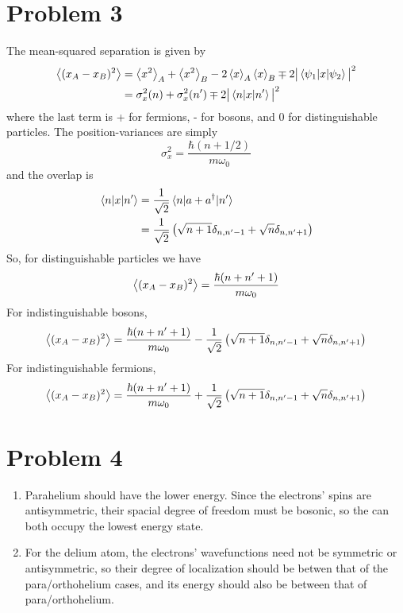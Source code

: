 \documentclass[12pt]{article}
\newcommand{\magsq}[1]{\big|#1\big|^2}
\begin{document}
\section*{Problem 3}
The mean-squared separation is given by
\begin{align*}
    \ev{(x_A - x_B)^2} &= \ev{x^2}_A + \ev{x^2}_B - 2\ev{x}_A\ev{x}_B \mp 2\magsq{\mel{\psi_1}{x}{\psi_2}} \\
    &= \sigma_x^2(n) + \sigma_x^2(n') \mp 2\magsq{\mel{n}{x}{n'}}
\end{align*}
where the last term is + for fermions, - for bosons, and 0 for distinguishable particles. The position-variances are simply
\[ \sigma_x^2 = \frac{\hbar(n + 1/2)}{m\omega_0} \]
and the overlap is
\begin{align*}
    \mel{n}{x}{n'} &= \frac{1}{\sqrt{2}}\mel{n}{a + a^{\dag}}{n'} \\
    &= \frac{1}{\sqrt{2}}\left(\sqrt{n+1}\delta_{n,n'-1} + \sqrt{n}\delta_{n, n'+1}\right)
\end{align*}
So, for distinguishable particles we have
\[ \ev{(x_A - x_B)^2} = \frac{\hbar(n + n' + 1)}{m\omega_0} \]
For indistinguishable bosons,
\[ \ev{(x_A - x_B)^2} = \frac{\hbar(n + n' + 1)}{m\omega_0} - \frac{1}{\sqrt{2}}\left(\sqrt{n+1}\delta_{n,n'-1} + \sqrt{n}\delta_{n, n'+1}\right)  \]
For indistinguishable fermions,
\[ \ev{(x_A - x_B)^2} = \frac{\hbar(n + n' + 1)}{m\omega_0} + \frac{1}{\sqrt{2}}\left(\sqrt{n+1}\delta_{n,n'-1} + \sqrt{n}\delta_{n, n'+1}\right)  \]


\section*{Problem 4}
\begin{enumerate}[label=(\alph*)]
    \item Parahelium should have the lower energy. Since the electrons' spins are antisymmetric, their spacial degree of freedom must be bosonic, so the can both occupy the lowest energy state.
    \item For the delium atom, the electrons' wavefunctions need not be symmetric or antisymmetric, so their degree of localization should be betwen that of the para/orthohelium cases, and its energy should also be between that of para/orthohelium.
\end{enumerate}
\end{document}
